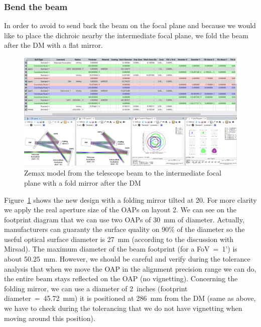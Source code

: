 \documentclass[12pt,a4paper]{article}
\begin{document}
\subsubsection{Bend the beam}
In order to avoid to send back the beam on the focal plane and because we would like to place the dichroic nearby the intermediate focal plane, we fold the beam after the DM with a flat mirror.
\begin{figure}[H]
	\begin{center}
		\includegraphics[width=\textwidth]{images/FP_2_intFP_FoldMirror.PNG}
		\caption{Zemax model from the telescope beam to the intermediate focal plane with a fold mirror after the DM}\label{fig:FP_2_intFP_FoldMirror}
	\end{center}
\end{figure}
Figure~\ref{fig:FP_2_intFP_FoldMirror} shows the new design with a folding mirror tilted at 20\degree. For more clarity we apply the real aperture size of the OAPs on layout 2. We can see on the footprint diagram that we can use two OAPs of 30~mm of diameter. Actually, manufacturers can guaranty the surface quality on 90\% of the diameter so the useful optical surface diameter is 27~mm (according to the discussion with Mirsad). The maximum diameter of the beam footprint (for a FoV~=~1') is about 50.25~mm. However, we should be careful and verify during the tolerance analysis that when we move the OAP in the alignment precision range we can do, the entire beam stays reflected on the OAP (no vignetting). Concerning the folding mirror, we can use a diameter of 2~inches (footprint diameter~=~45.72~mm) it is positioned at 286~mm from the DM (same as above, we have to check during the tolerancing that we do not have vignetting when moving around this position).\\
\end{document}
